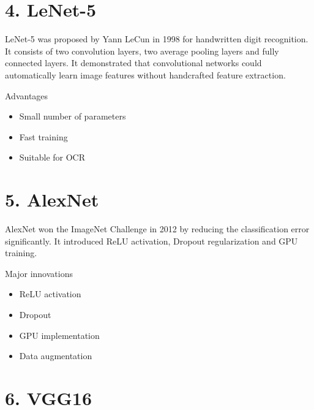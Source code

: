 \documentclass[11pt]{article}
\begin{document}

\section*{4. LeNet-5}

LeNet-5 was proposed by Yann LeCun in 1998 for handwritten digit
recognition. It consists of two convolution layers, two average pooling
layers and fully connected layers. It demonstrated that convolutional
networks could automatically learn image features without handcrafted
feature extraction.


Advantages

\begin{itemize}

\item Small number of parameters

\item Fast training

\item Suitable for OCR

\end{itemize}


\section*{5. AlexNet}

AlexNet won the ImageNet Challenge in 2012 by reducing the
classification error significantly. It introduced ReLU activation,
Dropout regularization and GPU training.


Major innovations

\begin{itemize}

\item ReLU activation

\item Dropout

\item GPU implementation

\item Data augmentation

\end{itemize}


\section*{6. VGG16}
\end{document}
